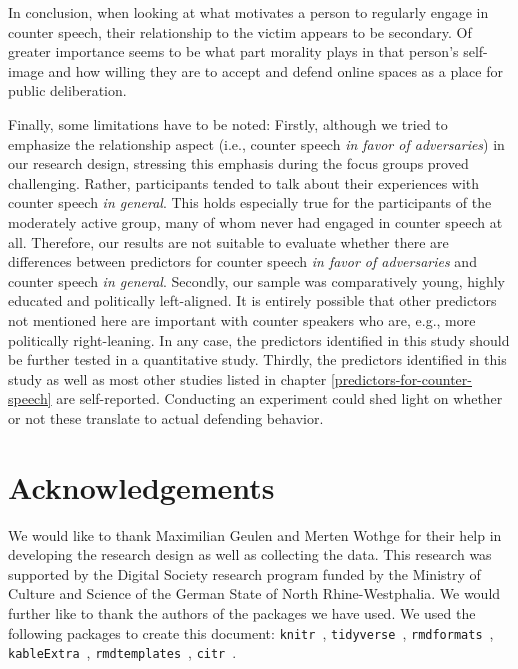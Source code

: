 \documentclass[runningheads]{llncs}
\begin{document}
In conclusion, when looking at what motivates a person to regularly engage in counter speech, their relationship to the victim appears to be secondary. Of greater importance seems to be what part morality plays in that person's self-image and how willing they are to accept and defend online spaces as a place for public deliberation.

Finally, some limitations have to be noted: Firstly, although we tried to emphasize the relationship aspect (i.e., counter speech \emph{in favor of adversaries}) in our research design, stressing this emphasis during the focus groups proved challenging. Rather, participants tended to talk about their experiences with counter speech \emph{in general}. This holds especially true for the participants of the moderately active group, many of whom never had engaged in counter speech at all. Therefore, our results are not suitable to evaluate whether there are differences between predictors for counter speech \emph{in favor of adversaries} and counter speech \emph{in general}. Secondly, our sample was comparatively young, highly educated and politically left-aligned. It is entirely possible that other predictors not mentioned here are important with counter speakers who are, e.g., more politically right-leaning.
In any case, the predictors identified in this study should be further tested in a quantitative study.
Thirdly, the predictors identified in this study as well as most other studies listed in chapter \ref{predictors-for-counter-speech} are self-reported.
Conducting an experiment could shed light on whether or not these translate to actual defending behavior.

\hypertarget{acknowledgements}{%
\section*{Acknowledgements}\label{acknowledgements}}

We would like to thank Maximilian Geulen and Merten Wothge for their help in developing the research design as well as collecting the data.
This research was supported
by the Digital Society research program funded by the
Ministry of Culture and Science of the German State of North
Rhine-Westphalia. We would further like to thank the authors of the packages we have used.
We used the following packages to create this document: \texttt{knitr}~\autocite{R-knitr}, \texttt{tidyverse}~\autocite{R-tidyverse}, \texttt{rmdformats}~\autocite{R-rmdformats}, \texttt{kableExtra}~\autocite{R-kableExtra}, \texttt{rmdtemplates}~\autocite{R-rmdtemplates}, \texttt{citr}~\autocite{R-citr}.


%
%
%
%
%
\printbibliography
\end{document}
